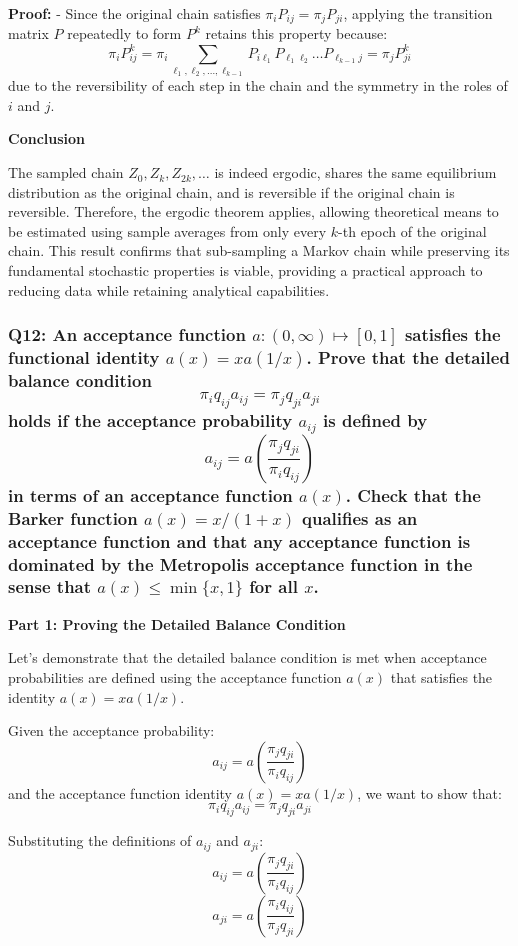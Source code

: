 \documentclass[8pt]{article}
\begin{document}
\textbf{Proof:}
- Since the original chain satisfies \(\pi_i P_{ij} = \pi_j P_{ji}\), applying the transition matrix \(P\) repeatedly to form \(P^k\) retains this property because:
  \[
  \pi_i P^k_{ij} = \pi_i \sum_{\ell_1, \ell_2, \ldots, \ell_{k-1}} P_{i\ell_1} P_{\ell_1\ell_2} \ldots P_{\ell_{k-1}j} = \pi_j P^k_{ji}
  \]
  due to the reversibility of each step in the chain and the symmetry in the roles of \(i\) and \(j\).

\textbf{Conclusion}

The sampled chain \(Z_0, Z_k, Z_{2k}, \ldots\) is indeed ergodic, shares the same equilibrium distribution as the original chain, and is reversible if the original chain is reversible. Therefore, the ergodic theorem applies, allowing theoretical means to be estimated using sample averages from only every \(k\)-th epoch of the original chain. This result confirms that sub-sampling a Markov chain while preserving its fundamental stochastic properties is viable, providing a practical approach to reducing data while retaining analytical capabilities.

\subsubsection*{Q12:
An acceptance function \(a : (0, \infty) \mapsto [0, 1]\) satisfies the functional identity \(a(x) = x a(1/x)\). Prove that the detailed balance condition
\[
\pi_i q_{ij} a_{ij} = \pi_j q_{ji} a_{ji}
\]
holds if the acceptance probability \(a_{ij}\) is defined by
\[
a_{ij} = a \left( \frac{\pi_j q_{ji}}{\pi_i q_{ij}} \right)
\]
in terms of an acceptance function \(a(x)\). Check that the Barker function \(a(x) = x / (1 + x)\) qualifies as an acceptance function and that any acceptance function is dominated by the Metropolis acceptance function in the sense that \(a(x) \leq \min\{x, 1\}\) for all \(x\).}

\textbf{Part 1: Proving the Detailed Balance Condition}

Let's demonstrate that the detailed balance condition is met when acceptance probabilities are defined using the acceptance function \( a(x) \) that satisfies the identity \( a(x) = x a(1/x) \).

Given the acceptance probability:
\[
a_{ij} = a \left( \frac{\pi_j q_{ji}}{\pi_i q_{ij}} \right)
\]
and the acceptance function identity \( a(x) = x a(1/x) \), we want to show that:
\[
\pi_i q_{ij} a_{ij} = \pi_j q_{ji} a_{ji}
\]

Substituting the definitions of \(a_{ij}\) and \(a_{ji}\):
\[
a_{ij} = a \left( \frac{\pi_j q_{ji}}{\pi_i q_{ij}} \right)
\]
\[
a_{ji} = a \left( \frac{\pi_i q_{ij}}{\pi_j q_{ji}} \right)
\]
\end{document}
